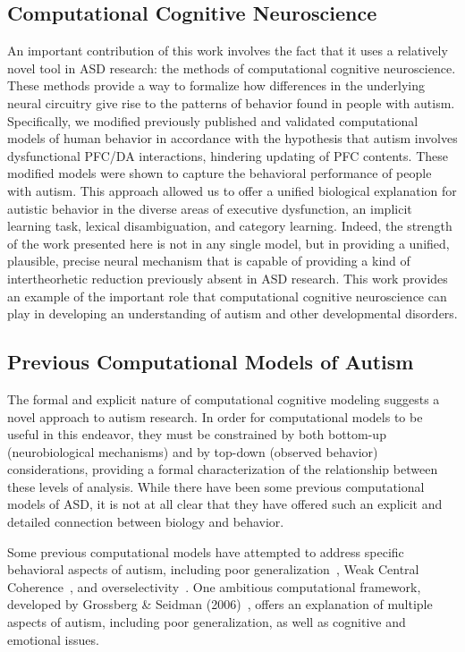 %
%

\subsection{Computational Cognitive Neuroscience}
An important contribution of this work involves the fact that it uses a relatively novel tool in ASD research: the methods of computational cognitive neuroscience. These methods provide a way to formalize how differences in the underlying neural circuitry give rise to the patterns of behavior found in people with autism. Specifically, we modified previously published and validated computational models of human behavior in accordance with the hypothesis that autism involves dysfunctional PFC/DA interactions, hindering updating of PFC contents. These modified models were shown to capture the behavioral performance of people with autism. This approach allowed us to offer a unified biological explanation for autistic behavior in the diverse areas of executive dysfunction, an implicit learning task, lexical disambiguation, and category learning. Indeed, the strength of the work presented here is not in any single model, but in providing a unified, plausible, precise neural mechanism that is capable of providing a kind of intertheorhetic reduction previously absent in ASD research. This work provides an example of the important role that computational cognitive neuroscience can play in developing an understanding of autism and other developmental disorders.

\subsection{Previous Computational Models of Autism}
The formal and explicit nature of computational cognitive modeling suggests a novel approach to autism research. In order for computational models to be useful in this endeavor, they must be constrained by both bottom-up (neurobiological mechanisms) and by top-down (observed behavior) considerations, providing a formal characterization of the relationship between these levels of analysis. While there have been some previous computational models of ASD, it is not at all clear that they have offered such an explicit and detailed connection between biology and behavior.

Some previous computational models have attempted to address specific behavioral aspects of autism, including poor generalization~\cite{CohenIL:1994:AutismLearning,GustafssonL:1997:AutismMaps}, Weak Central Coherence~\cite{OLoughlinC:2000:Coherence}, and overselectivity~\cite{McClellandJL:2000:Autism}. One ambitious computational framework, developed by Grossberg \& Seidman (2006)~\nocite{RefWorks:146}, offers an explanation of multiple aspects of autism, including poor generalization, as well as cognitive and emotional issues.

